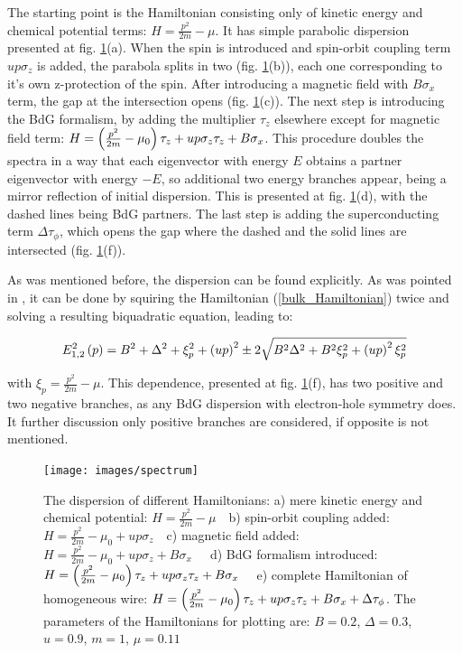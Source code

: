 The starting point is the Hamiltonian consisting only of kinetic energy and chemical potential terms: $ H =\frac{ p^2}{2m} - \mu$. It has simple parabolic dispersion presented at fig. \ref{fig:spectrum}(a). When the spin is introduced and spin-orbit coupling term $ up\sigma_z $ is added, the parabola splits in two (fig. \ref{fig:spectrum}(b)), each one corresponding to it's own z-protection of the spin. After introducing a magnetic field with $ B\sigma_x $ term, the gap at the intersection opens (fig. \ref{fig:spectrum}(c)). The next step is introducing the BdG formalism, by adding the multiplier $ \tau_z $ elsewhere except for magnetic field term:  $ 	H = \left(\frac{p^2}{2m} 	-\mu_0 \right)\tau_z +u p \sigma_z \tau_z + B\sigma_x	 $. This procedure doubles the spectra in a way that each eigenvector with energy $ E $ obtains a partner eigenvector with energy $ -E $, so additional two energy branches appear, being a mirror reflection of  initial dispersion. This is presented at fig. \ref{fig:spectrum}(d), with the dashed lines being BdG partners. The last step is adding the superconducting term $ \Delta\tau_\phi $, which opens the gap where the dashed and the solid lines are intersected (fig. \ref{fig:spectrum}(f)).

As was mentioned before, the dispersion can be found explicitly. As was pointed in \cite{Oreg_2010}, it can be done by squiring the Hamiltonian (\ref{bulk_Hamiltonian}) twice and solving a resulting biquadratic equation, leading to:


\begin{equation}
E^2_{1,2}\left(p\right)
=
B^2
+
\Delta^2
+
\xi_p^2
+
\left(up\right)^2
\pm	
2\sqrt{
	B^2 \Delta^2
	+
	B^2\xi_p^2
	+
	\left(up\right)^2\xi_p^2
}
\end{equation}

with $ \xi_p =\frac{p^2}{2m}-\mu$. This dependence, presented at fig. \ref{fig:spectrum}(f), has two positive and two negative branches, as any BdG dispersion with electron-hole symmetry does. It further discussion only positive branches are considered, if opposite is not mentioned.

\begin{figure}[H]
	\centering
	\texttt{[image: images/spectrum]}
	\caption{The dispersion of different Hamiltonians:
		 a)  mere kinetic energy and chemical potential: $ H =\frac{ p^2}{2m} - \mu ~~~$
		 b) spin-orbit coupling added: $ 	H = \frac{p^2}{2m}-\mu_0 + u p \sigma_z ~~~$
		 c) magnetic field added: $ 	H = \frac{p^2}{2m} 	-\mu_0  +u p \sigma_z  + B\sigma_x ~~~~~$
		 d) BdG formalism introduced: $ 	H = \left(\frac{p^2}{2m} 	-\mu_0 \right)\tau_z +u p \sigma_z \tau_z + B\sigma_x	~~~ $
		 e) complete Hamiltonian of homogeneous wire: $ 	H = \left(\frac{p^2}{2m} 	-\mu_0 \right)\tau_z +u p \sigma_z \tau_z + B\sigma_x	+ \Delta\tau_\phi $.
		 The parameters of the Hamiltonians for plotting are: $ B=0.2 $, $ \Delta=0.3 $, $ u=0.9 $, $ m = 1 $, $ \mu = 0.11 $ 
 }
	\label{fig:spectrum}
\end{figure}

